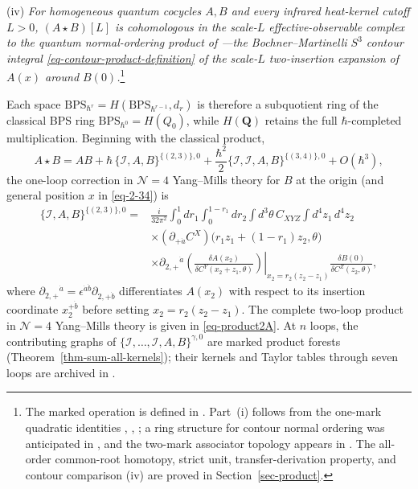 \documentclass[11pt]{article}
\numberwithin{equation}{section}
\numberwithin{figure}{section}
\numberwithin{table}{section}
\begin{document}
(iv) \emph{For homogeneous quantum cocycles $A,B$ and every infrared heat-kernel cutoff $L>0$, $(A\star B)[L]$ is cohomologous in the scale-$L$ effective-observable complex to the quantum normal-ordering product of \cite[Section 2.3]{semichiral}---the Bochner--Martinelli $S^3$ contour integral \eqref{eq-contour-product-definition} of the scale-$L$ two-insertion expansion of $A(x)$ around $B(0)$.}\footnote{The marked operation is defined in \cite[Sections 4.3 and 4.5]{higher}. Part~(i) follows from the one-mark quadratic identities \cite[Section 3.2]{operatope}, \cite[Theorem 7]{Wang}, \cite[Equations (4.19), (4.42)]{higher}; a ring structure for contour normal ordering was anticipated in \cite[Section 2.2 and footnote 28]{semichiral}, and the two-mark associator topology appears in \cite[Figure 7]{higher}. The all-order common-root homotopy, strict unit, transfer-derivation property, and contour comparison (iv) are proved in Section~\ref{sec-product}.}

Each space $\mathrm{BPS}_{\hbar^r}=H(\mathrm{BPS}_{\hbar^{r-1}},d_r)$ is therefore a subquotient ring of the classical BPS ring $\mathrm{BPS}_{\hbar^0}=H(Q_0)$, while $H(\mathbf Q)$ retains the full $\hbar$-completed multiplication. Beginning with the classical product,
\begin{equation}\label{eq-sum-product-expansion}
A\star B=AB+\hbar\,\{\mathcal I,A,B\}^{\{(2,3)\},0}+\frac{\hbar^2}{2}\{\mathcal I,\mathcal I,A,B\}^{\{(3,4)\},0}+O(\hbar^3),
\end{equation}
the one-loop correction in $\mathcal N=4$ Yang--Mills theory for $B$ at the origin (and general position $x$ in \eqref{eq-2-34}) is
\begin{equation}\label{eq-sum-product1}
\begin{aligned}
\{\mathcal I,A,B\}^{\{(2,3)\},0}
={}&\frac{i}{32\pi^2}\int_0^1dr_1\int_0^{1-r_1}dr_2
\int d^3\theta\,C_{XYZ}\int d^4z_1\,d^4z_2\\
&\times(\partial_{+\dot a}C^X)\big(r_1z_1+(1-r_1)z_2,\theta\big)\\
&\times\left.
\partial_{2,+}{}^{\dot a}
\left(\frac{\delta A(x_2)}{\delta C^Y(x_2+z_1,\theta)}\right)
\right|_{x_2=r_2(z_2-z_1)}
\frac{\delta B(0)}{\delta C^Z(z_2,\theta)},
\end{aligned}
\end{equation}
where $\partial_{2,+}{}^{\dot a}=\epsilon^{\dot a\dot b}\partial_{2,+\dot b}$ differentiates $A(x_2)$ with respect to its insertion coordinate $x_2^{+\dot b}$ before setting $x_2=r_2(z_2-z_1)$. The complete two-loop product in $\mathcal N=4$ Yang--Mills theory is given in \eqref{eq-product2A}. At $n$ loops, the contributing graphs of $\{\mathcal I,\ldots,\mathcal I,A,B\}^{\gamma,0}$ are marked product forests (Theorem~\ref{thm-sum-all-kernels}); their kernels and Taylor tables through seven loops are archived in \cite{KernelRepo}.
\end{document}
